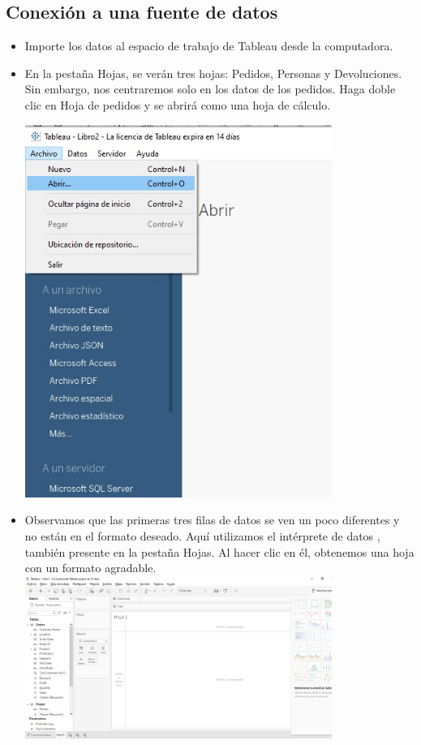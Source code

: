 \documentclass[preprint,12pt]{elsarticle}
\begin{document}
	\subsection{Conexión a una fuente de datos}
		\begin{itemize}
			\item Importe los datos al espacio de trabajo de Tableau desde la computadora.

			
			\item En la pestaña Hojas, se verán tres hojas: Pedidos, Personas y Devoluciones. Sin embargo, nos
			centraremos solo en los datos de los pedidos. Haga doble clic en Hoja de pedidos y se abrirá
			como una hoja de cálculo. 
				
				\includegraphics[width=10cm]{./IMAGENES/3.1}
			
			\item Observamos que las primeras tres filas de datos se ven un poco diferentes y no están en el
			formato deseado. Aquí utilizamos el intérprete de datos , también presente en la pestaña
			Hojas. Al hacer clic en él, obtenemos una hoja con un formato agradable. \\
				\includegraphics[width=10cm]{./IMAGENES/3.1.3}
		\end{itemize}
	
\end{document}
